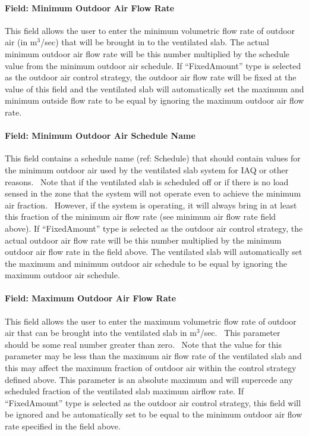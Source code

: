 \paragraph{Field: Minimum Outdoor Air Flow Rate}\label{field-minimum-outdoor-air-flow-rate-001}

This field allows the user to enter the minimum volumetric flow rate of outdoor air (in m\(^{3}\)/sec) that will be brought in to the ventilated slab. The actual minimum outdoor air flow rate will be this number multiplied by the schedule value from the minimum outdoor air schedule. If ``FixedAmount'' type is selected as the outdoor air control strategy, the outdoor air flow rate will be fixed at the value of this field and the ventilated slab will automatically set the maximum and minimum outside flow rate to be equal by ignoring the maximum outdoor air flow rate.

\paragraph{Field: Minimum Outdoor Air Schedule Name}\label{field-minimum-outdoor-air-schedule-name-001}

This field contains a schedule name (ref: Schedule) that should contain values for the minimum outdoor air used by the ventilated slab system for IAQ or other reasons.~ Note that if the ventilated slab is scheduled off or if there is no load sensed in the zone that the system will not operate even to achieve the minimum air fraction.~ However, if the system is operating, it will always bring in at least this fraction of the minimum air flow rate (see minimum air flow rate field above). If ``FixedAmount'' type is selected as the outdoor air control strategy, the actual outdoor air flow rate will be this number multiplied by the minimum outdoor air flow rate in the field above. The ventilated slab will automatically set the maximum and minimum outdoor air schedule to be equal by ignoring the maximum outdoor air schedule.

\paragraph{Field: Maximum Outdoor Air Flow Rate}\label{field-maximum-outdoor-air-flow-rate-001}

This field allows the user to enter the maximum volumetric flow rate of outdoor air that can be brought into the ventilated slab in m\(^{3}\)/sec.~ This parameter should be some real number greater than zero.~ Note that the value for this parameter may be less than the maximum air flow rate of the ventilated slab and this may affect the maximum fraction of outdoor air within the control strategy defined above. This parameter is an absolute maximum and will supercede any scheduled fraction of the ventilated slab maximum airflow rate. If ``FixedAmount'' type is selected as the outdoor air control strategy, this field will be ignored and be automatically set to be equal to the minimum outdoor air flow rate specified in the field above.

